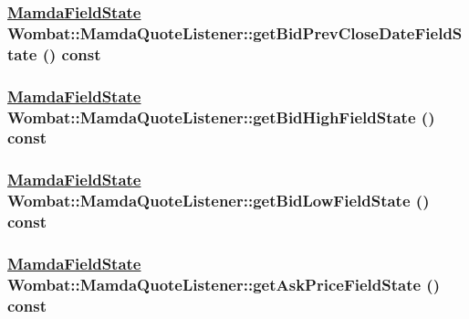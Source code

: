 \hypertarget{classWombat_1_1MamdaQuoteListener_03a1620ee6559319e5d24a9519f9ba83}{
\subsubsection[getBidPrevCloseDateFieldState]{\setlength{\rightskip}{0pt plus 5cm}\hyperlink{namespaceWombat_93aac974f2ab713554fd12a1fa3b7d2a}{Mamda\-Field\-State} Wombat::Mamda\-Quote\-Listener::get\-Bid\-Prev\-Close\-Date\-Field\-State () const}}
\label{classWombat_1_1MamdaQuoteListener_03a1620ee6559319e5d24a9519f9ba83}


\hypertarget{classWombat_1_1MamdaQuoteListener_8c2949e6f90e88d5d2fcabebf0c5e173}{
\subsubsection[getBidHighFieldState]{\setlength{\rightskip}{0pt plus 5cm}\hyperlink{namespaceWombat_93aac974f2ab713554fd12a1fa3b7d2a}{Mamda\-Field\-State} Wombat::Mamda\-Quote\-Listener::get\-Bid\-High\-Field\-State () const}}
\label{classWombat_1_1MamdaQuoteListener_8c2949e6f90e88d5d2fcabebf0c5e173}


\hypertarget{classWombat_1_1MamdaQuoteListener_d35cb68b55f7b1bef90b4b9097958c62}{
\subsubsection[getBidLowFieldState]{\setlength{\rightskip}{0pt plus 5cm}\hyperlink{namespaceWombat_93aac974f2ab713554fd12a1fa3b7d2a}{Mamda\-Field\-State} Wombat::Mamda\-Quote\-Listener::get\-Bid\-Low\-Field\-State () const}}
\label{classWombat_1_1MamdaQuoteListener_d35cb68b55f7b1bef90b4b9097958c62}


\hypertarget{classWombat_1_1MamdaQuoteListener_28dd174c3b718a3def1d09b04ab68577}{
\subsubsection[getAskPriceFieldState]{\setlength{\rightskip}{0pt plus 5cm}\hyperlink{namespaceWombat_93aac974f2ab713554fd12a1fa3b7d2a}{Mamda\-Field\-State} Wombat::Mamda\-Quote\-Listener::get\-Ask\-Price\-Field\-State () const}}
\label{classWombat_1_1MamdaQuoteListener_28dd174c3b718a3def1d09b04ab68577}


